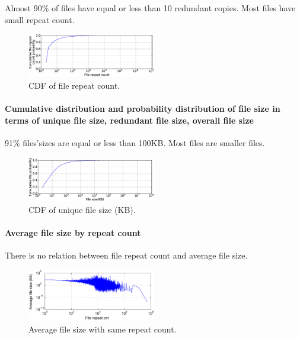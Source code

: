 Almost 90\% of files have equal or less than 10 redundant copies. Most files have small repeat count.

\begin{figure}
	\centering
	\includegraphics[width=0.5\textwidth]{graphs/File_repeat_count.eps}
	\caption{CDF of file repeat count.
	}
	\label{fig_file_repeat_count}
\end{figure}

\paragraph{Cumulative distribution and probability distribution of file size in terms of unique file size, redundant file size, overall file size}

91\% files'sizes are equal or less than 100KB. Most files are smaller files.

\begin{figure}
	\centering
	\includegraphics[width=0.5\textwidth]{graphs/File_size-KB.eps}
	\caption{CDF of unique file size (KB).
	}
	\label{fig_file_size}
\end{figure}

\paragraph{Average file size by repeat count}

There is no relation between file repeat count and average file size.

\begin{figure}
	\centering
	\includegraphics[width=0.5\textwidth]{graphs/avg_size_by_cnt.eps}
	\caption{Average file size with same repeat count.
	}
	\label{fig_avg_size_by_cnt}
\end{figure}

